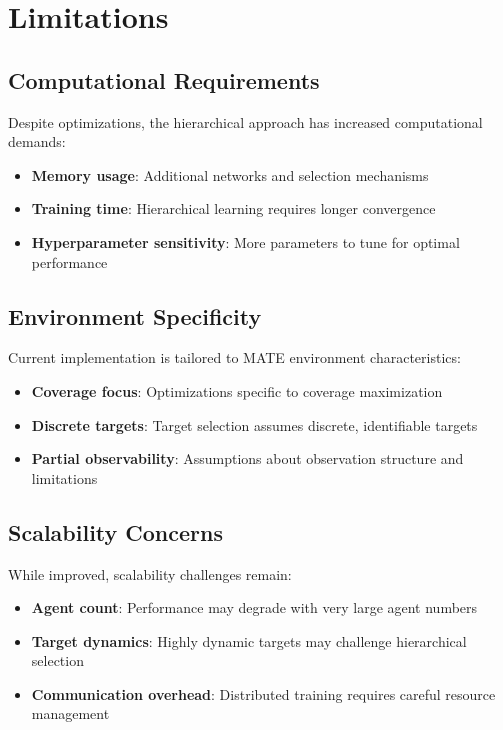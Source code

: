 \documentclass[conference]{IEEEtran}
\begin{document}
\section{Limitations}

\subsection{Computational Requirements}
Despite optimizations, the hierarchical approach has increased computational demands:
\begin{itemize}
\item \textbf{Memory usage}: Additional networks and selection mechanisms
\item \textbf{Training time}: Hierarchical learning requires longer convergence
\item \textbf{Hyperparameter sensitivity}: More parameters to tune for optimal performance
\end{itemize}

\subsection{Environment Specificity}
Current implementation is tailored to MATE environment characteristics:
\begin{itemize}
\item \textbf{Coverage focus}: Optimizations specific to coverage maximization
\item \textbf{Discrete targets}: Target selection assumes discrete, identifiable targets
\item \textbf{Partial observability}: Assumptions about observation structure and limitations
\end{itemize}

\subsection{Scalability Concerns}
While improved, scalability challenges remain:
\begin{itemize}
\item \textbf{Agent count}: Performance may degrade with very large agent numbers
\item \textbf{Target dynamics}: Highly dynamic targets may challenge hierarchical selection
\item \textbf{Communication overhead}: Distributed training requires careful resource management
\end{itemize}
\end{document}
